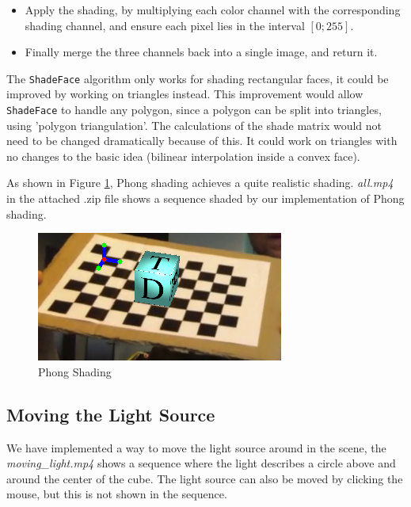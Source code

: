 \documentclass[a4paper,11pt]{article}
\begin{document}
\begin{itemize}
\item Apply the shading, by multiplying each color channel with the corresponding shading channel, and ensure each pixel lies in the interval $[0;255]$.

\item Finally merge the three channels back into a single image, and return it.
\end{itemize}

The \texttt{ShadeFace} algorithm only works for shading rectangular faces, it could be improved by working on triangles instead. This improvement would allow \texttt{ShadeFace} to handle any polygon, since a polygon can be split into triangles, using 'polygon triangulation'. The calculations of the shade matrix would not need to be changed dramatically because of this. It could work on triangles with no changes to the basic idea (bilinear interpolation inside a convex face).

As shown in Figure \ref{fig:full_shading}, Phong shading achieves a quite realistic shading. \emph{all.mp4} in the attached .zip file shows a sequence shaded by our implementation of Phong shading.

\begin{figure}[H]
  \centering
  \includegraphics[width=0.5\linewidth]{full_shading}
  \caption{Phong Shading}
  \label{fig:full_shading}
\end{figure}

\subsection{Moving the Light Source}
We have implemented a way to move the light source around in the scene, the \emph{moving\_light.mp4} shows a sequence where the light describes a circle above and around the center of the cube. The light source can also be moved by clicking the mouse, but this is not shown in the sequence.
\end{document}
